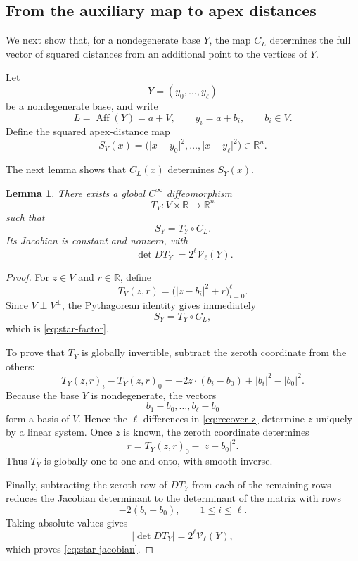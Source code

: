 \documentclass[11pt]{article}
\newtheorem{lemma}[theorem]{Lemma}
\theoremstyle{remark}
\newcommand{\R}{\mathbb R}
\numberwithin{equation}{section}
\newcommand{\1}{\mathbf 1}
\begin{document}
\subsection{From the auxiliary map to apex distances}

We next show that, for a nondegenerate base \(Y\), the map \(C_L\)
determines the full vector of squared distances from an additional point
to the vertices of \(Y\).

Let
\[
Y=(y_0,\ldots,y_\ell)
\]
be a nondegenerate base, and write
\[
L=\operatorname{Aff}(Y)=a+V,
\qquad
y_i=a+b_i,
\qquad
b_i\in V.
\]
Define the squared apex-distance map
\begin{equation}
S_Y(x)
=
\bigl(
\lvert x-y_0\rvert^2,\ldots,
\lvert x-y_\ell\rvert^2
\bigr)
\in\R^n.
\label{eq:apex-map-main}
\end{equation}

The next lemma shows that \(C_L(x)\) determines \(S_Y(x)\).

\begin{lemma}
\label{lem:cylinder-star}
There exists a global \(C^\infty\) diffeomorphism
\[
T_Y:V\times\R\longrightarrow\R^n
\]
such that
\begin{equation}
S_Y=T_Y\circ C_L.
\label{eq:star-factor}
\end{equation}
Its Jacobian is constant and nonzero, with
\begin{equation}
\lvert\det DT_Y\rvert
=
2^\ell\mathcal V_\ell(Y).
\label{eq:star-jacobian}
\end{equation}
\end{lemma}

\begin{proof}
For \(z\in V\) and \(r\in\R\), define
\[
T_Y(z,r)
=
\bigl(
\lvert z-b_i\rvert^2+r
\bigr)_{i=0}^\ell.
\]
Since \(V\perp V^\perp\), the Pythagorean identity gives immediately
\[
S_Y=T_Y\circ C_L,
\]
which is \eqref{eq:star-factor}.

To prove that \(T_Y\) is globally invertible, subtract the zeroth
coordinate from the others:
\begin{equation}
T_Y(z,r)_i-T_Y(z,r)_0
=
-2z\cdot(b_i-b_0)
+\lvert b_i\rvert^2-\lvert b_0\rvert^2.
\label{eq:recover-z}
\end{equation}
Because the base \(Y\) is nondegenerate, the vectors
\[
b_1-b_0,\ldots,b_\ell-b_0
\]
form a basis of \(V\).  Hence the \(\ell\) differences in
\eqref{eq:recover-z} determine \(z\) uniquely by a linear system.  Once
\(z\) is known, the zeroth coordinate determines
\[
r
=
T_Y(z,r)_0-\lvert z-b_0\rvert^2.
\]
Thus \(T_Y\) is globally one-to-one and onto, with smooth inverse.

Finally, subtracting the zeroth row of \(DT_Y\) from each of the
remaining rows reduces the Jacobian determinant to the determinant of
the matrix with rows
\[
-2(b_i-b_0),
\qquad
1\leq i\leq \ell.
\]
Taking absolute values gives
\[
\lvert\det DT_Y\rvert
=
2^\ell\mathcal V_\ell(Y),
\]
which proves \eqref{eq:star-jacobian}.
\end{proof}
\end{document}
